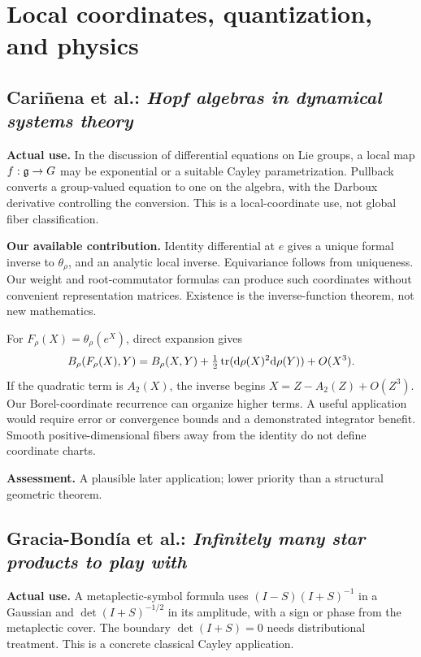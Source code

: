 \section{Local coordinates, quantization, and physics}
\subsection{Cari\~nena et al.: \emph{Hopf algebras in dynamical systems theory}}

\textbf{Actual use.} In the discussion of differential equations on Lie groups, a local map $f:\mathfrak g\to G$ may be exponential or a suitable Cayley parametrization. Pullback converts a group-valued equation to one on the algebra, with the Darboux derivative controlling the conversion. This is a local-coordinate use, not global fiber classification.

\textbf{Our available contribution.} Identity differential at $e$ gives a unique formal inverse to $\theta_\rho$, and an analytic local inverse. Equivariance follows from uniqueness. Our weight and root-commutator formulas can produce such coordinates without convenient representation matrices. Existence is the inverse-function theorem, not new mathematics.

For $F_\rho(X)=\theta_\rho(e^X)$, direct expansion gives
\[
B_\rho(F_\rho(X),Y)=B_\rho(X,Y)
+\tfrac12\operatorname{tr}(\mathrm d\rho(X)^2\mathrm d\rho(Y))+O(X^3).
\]
If the quadratic term is $A_2(X)$, the inverse begins $X=Z-A_2(Z)+O(Z^3)$. Our Borel-coordinate recurrence can organize higher terms. A useful application would require error or convergence bounds and a demonstrated integrator benefit. Smooth positive-dimensional fibers away from the identity do not define coordinate charts.

\textbf{Assessment.} A plausible later application; lower priority than a structural geometric theorem.

\subsection{Gracia-Bond\'ia et al.: \emph{Infinitely many star products to play with}}

\textbf{Actual use.} A metaplectic-symbol formula uses $(I-S)(I+S)^{-1}$ in a Gaussian and $\det(I+S)^{-1/2}$ in its amplitude, with a sign or phase from the metaplectic cover. The boundary $\det(I+S)=0$ needs distributional treatment. This is a concrete classical Cayley application.

